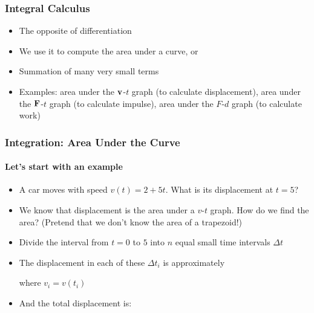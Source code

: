 \documentclass[12pt,compress,aspectratio=169]{beamer}
\newcommand{\mb}[1]{\ensuremath\mathbf{#1}}
\begin{document}
\begin{frame}
  \frametitle{Integral Calculus}
  \begin{itemize}
  \item The opposite of differentiation
  \item We use it to compute the area under a curve, or
  \item Summation of many very small terms
  \item Examples: area under the $\mb{v}$-$t$ graph (to calculate
    displacement), area under the $\mb{F}$-$t$ graph (to calculate impulse),
    area under the $F$-$d$ graph (to calculate work)
  \end{itemize}
\end{frame}


\begin{frame}
  \frametitle{Integration: Area Under the Curve}
  \framesubtitle{Let's start with an example}
  \begin{itemize}
  \item A car moves with speed $v(t)=2+5t$. What is its displacement at $t=5$?
  \item We know that displacement is the area under a $v$-$t$ graph. How do we
    find the area? (Pretend that we don't know the area of a trapezoid!)
  \item Divide the interval from $t=0$ to $5$ into $n$ equal small time
    intervals $\Delta t$
  \item The displacement in each of these $\Delta t_i$ is approximately
    
    \vspace{-.2in}{\large
      \begin{displaymath}
        \Delta s_i = v_i\Delta t
      \end{displaymath}
    }
    
    \vspace{-.3in}where $v_i=v(t_i)$
  \item And the total displacement is:

  \end{itemize}
\end{frame}
\end{document}
